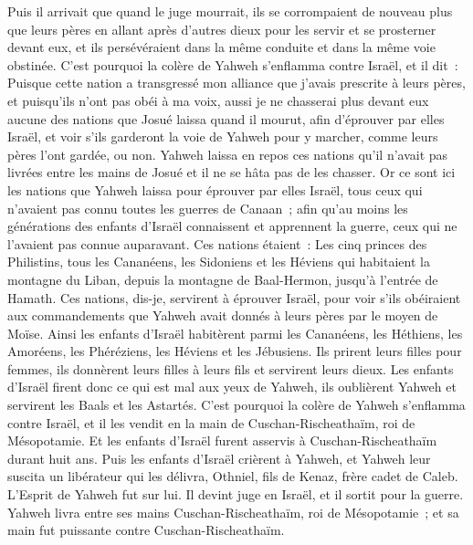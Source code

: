 \begin{multicols}{2}
Puis il arrivait que quand le juge mourrait, ils se corrompaient de nouveau plus que leurs pères en allant après d'autres dieux pour les servir et se prosterner devant eux, et ils persévéraient dans la même conduite et dans la même voie obstinée.
C'est pourquoi la colère de Yahweh s'enflamma contre Israël, et il dit~: Puisque cette nation a transgressé mon alliance que j'avais prescrite à leurs pères, et puisqu'ils n'ont pas obéi à ma voix,
aussi je ne chasserai plus devant eux aucune des nations que Josué laissa quand il mourut,
afin d'éprouver par elles Israël, et voir s'ils garderont la voie de Yahweh pour y marcher, comme leurs pères l'ont gardée, ou non.
Yahweh laissa en repos ces nations qu'il n'avait pas livrées entre les mains de Josué et il ne se hâta pas de les chasser.
\VerseOne{}Or ce sont ici les nations que Yahweh laissa pour éprouver par elles Israël, tous ceux qui n'avaient pas connu toutes les guerres de Canaan~; 
afin qu'au moins les générations des enfants d'Israël connaissent et apprennent la guerre, ceux qui ne l'avaient pas connue auparavant.
Ces nations étaient~: Les cinq princes des Philistins, tous les Cananéens, les Sidoniens et les Héviens qui habitaient la montagne du Liban, depuis la montagne de Baal-Hermon, jusqu'à l'entrée de Hamath.
Ces nations, dis-je, servirent à éprouver Israël, pour voir s'ils obéiraient aux commandements que Yahweh avait donnés à leurs pères par le moyen de Moïse.
Ainsi les enfants d'Israël habitèrent parmi les Cananéens, les Héthiens, les Amoréens, les Phéréziens, les Héviens et les Jébusiens.
Ils prirent leurs filles pour femmes, ils donnèrent leurs filles à leurs fils et servirent leurs dieux.
Les enfants d'Israël firent donc ce qui est mal aux yeux de Yahweh, ils oublièrent Yahweh et servirent les Baals et les Astartés.
C'est pourquoi la colère de Yahweh s'enflamma contre Israël, et il les vendit en la main de Cuschan-Rischeathaïm, roi de Mésopotamie. Et les enfants d'Israël furent asservis à Cuschan-Rischeathaïm durant huit ans.
Puis les enfants d'Israël crièrent à Yahweh, et Yahweh leur suscita un libérateur qui les délivra, Othniel, fils de Kenaz, frère cadet de Caleb.
L'Esprit de Yahweh fut sur lui. Il devint juge en Israël, et il sortit pour la guerre. Yahweh livra entre ses mains Cuschan-Rischeathaïm, roi de Mésopotamie~; et sa main fut puissante contre Cuschan-Rischeathaïm.

\end{multicols}
